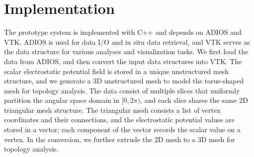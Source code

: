 \section{Implementation}
\label{sec:impl}

The prototype system is implemented with C++ and depends on ADIOS and VTK.  ADIOS is used for data I/O and in situ data retrieval, and VTK serves as the data structure for various analyses and visualization tasks.  We first load the data from ADIOS, and then convert the input data structures into VTK.  The scalar electrostatic potential field is stored in a unique unstructured mesh structure, and we generate a 3D unstructured mesh to model the torus-shaped mesh for topology analysis.  The data consist of multiple slices that uniformly partition the angular space domain in $[0, 2\pi)$, and each slice shares the same 2D triangular mesh structure.  The triangular mesh consists a list of vertex coordinates and their connections, and the electrostatic potential values are stored in a vector; each component of the vector records the scalar value on a vertex.  In the conversion, we further extrude the 2D mesh to a 3D mesh for topology analysis.  

